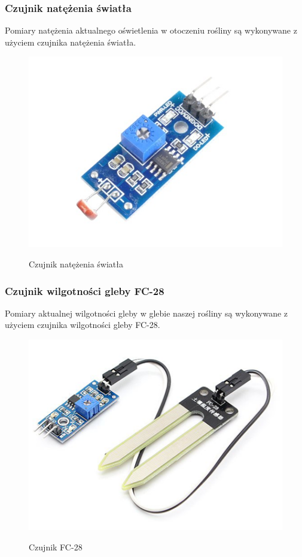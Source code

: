 \documentclass[12pt]{article}
\begin{document}
\subsubsection{Czujnik natężenia światła}
 Pomiary natężenia aktualnego oświetlenia w otoczeniu rośliny są wykonywane z użyciem czujnika natężenia światła. 
\begin{figure}[!h]
	\begin{center}
		{\includegraphics[width=12cm]{light_sensor_photo.png}}
	\end{center}
	\caption{Czujnik natężenia światła}
\end{figure}
\subsubsection{Czujnik wilgotności gleby FC-28}
 Pomiary aktualnej wilgotności gleby w glebie naszej rośliny są wykonywane z użyciem czujnika wilgotności gleby FC-28.

\begin{figure}[!h]
	\begin{center}
		{\includegraphics[width=12cm]{FC-28_photo.png}}
	\end{center}
	\caption{Czujnik FC-28}
\end{figure}
\end{document}
